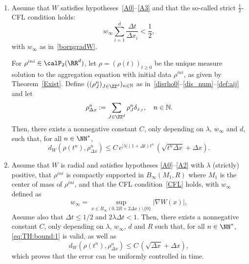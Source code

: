 \begin{theo}\label{TH}\ 
\begin{enumerate}\romanenumi
\item \label{2.2.1} Assume that $W$ satisfies hypotheses~\eqref{A0}--\eqref{A3} and that the so-called strict $\frac 12$-CFL condition holds:
\begin{equation}\label{CFL}
w_\infty \sum_{i=1}^d \frac{\Delta t}{\Delta x_i} < \frac 12,
\end{equation}
with $w_{\infty}$ as in~\eqref{borngradW}.

For $\rho^{ini} \in \calP_2(\RR^d)$, let $\rho=(\rho(t))_{t \ge 0}$ be the unique measure solution to the aggregation equation with initial data $\rho^{ini}$, as given by Theorem~\ref{Exist}. Define $((\rho_J^n)_{J\in \ZZ^d})_{n \in {\mathbb N}}$ as in~\eqref{disrho0}--\eqref{dis_num}--\eqref{def:aij} and let
\[
\rho_{\Delta x}^n := \sum_{J\in \ZZ^d} \rho_J^n \delta_{x_J},
\quad n \in {\mathbb N}.
\]
Then, there exists a nonnegative constant $C$, only depending on $\lambda$, $w_{\infty}$ and $d$, such that, for all $n\in \NN^*$,
\begin{equation}\label{eq:TH:bound:1}
d_W(\rho(t^n),\rho_{\Delta x}^n) \leq C \, e^{\vert \lambda \vert (1+\Delta t)t^n} \, (\sqrt{t^n \Delta x} + \Delta x ).
\end{equation}

\item \label{2.2.2} Assume that $W$ is radial and satisfies hypotheses
\eqref{A0}--\eqref{A2} with $\lambda$ (strictly) positive, that $\rho^{ini}$ is compactly supported in $B_\infty(M_1,R)$ where $M_1$ is the center of mass of $\rho^{ini}$, and that the CFL condition~\eqref{CFL} holds, with $w_{\infty}$ defined as
\begin{equation}\label{borngradW:lambda>0}
w_{\infty} = \sup_{x \in B_{\infty}(0,2R+2\Delta x) \setminus \{0\} } \vert \nabla W(x) \vert,
\end{equation}
Assume also that $\Delta t \leq 1/2$ and $2 \lambda \Delta t < 1$. Then, there exists a nonnegative constant $C$, only depending on $\lambda$, $w_{\infty}$, $d$ and $R$ such that, for all $n\in \NN^*$, \eqref{eq:TH:bound:1} is valid, as well as
\begin{equation}\label{eq:TH:bound:2}
d_W(\rho(t^n),\rho_{\Delta x}^n) \leq C \,
(\sqrt{\Delta x} + \Delta x ),
\end{equation}
which proves that the error can be uniformly controlled in time.
\end{enumerate}
\end{theo}

